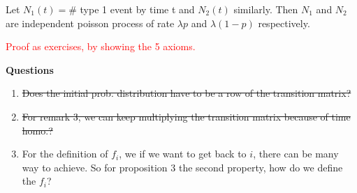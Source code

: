 \documentclass[10.5pt]{article}
\newenvironment{changemargin}[2]{%
  \begin{list}{}{%
    \setlength{\topsep}{0pt}%
    \setlength{\leftmargin}{#1}%
    \setlength{\rightmargin}{#2}%
    \setlength{\listparindent}{\parindent}%
    \setlength{\itemindent}{\parindent}%
    \setlength{\parsep}{\parskip}%
  }%
  \item[]}{\end{list}}
\begin{document}
\begin{changemargin}{-0.125in}{0in}
\begin{enumerate}
\begin{enumerate}
\begin{proposition}
                   	\smallskip
                   	
                   	Let $N_1(t) = \#$ type 1 event by time t and $N_2(t)$ similarly. Then $N_1$ and $N_2$ are independent poisson process of rate $\lambda p$ and $\lambda (1 - p)$ respectively. 
                   \end{proposition}
                   \textcolor{red}{Proof as exercises, by showing the 5 axioms.}
                   \end{enumerate}
      
	\end{enumerate}

    \cleardoublepage
    
    \textbf{Questions}
    
    \begin{enumerate}
    	\item \sout{Does the initial prob. distribution have to be a row of the transition matrix?} 
    	\item \sout{For remark 3, we can keep multiplying the transition matrix because of time homo.?}
    	\item For the definition of $f_i$, we if we want to get back to $i$, there can be many way to achieve. So for proposition 3 the second property, how do we define the $f_i$?
    	
    \end{enumerate}

\end{changemargin}
\end{document}
